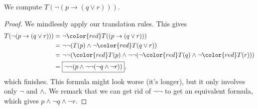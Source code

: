\begin{exe}
	We compute $T(\lnot(p\to(q\lor r)))$.
\end{exe}
\begin{proof}
	We mindlessly apply our translation rules. This gives
	\begin{align*}
		T(\lnot(p\to(q\lor r))) &= \lnot {\color{red}T((p\to(q\lor r)))} \\
		&= \lnot\lnot(T(p)\land\lnot {\color{red}T(q\lor r)}) \\
		&= \lnot\lnot({\color{red}T(p)}\land\lnot\lnot(\lnot {\color{red}T(q)}\land\lnot {\color{red}T(r)})) \\
		&= \boxed{\lnot\lnot(p\land\lnot\lnot(\lnot q\land\lnot r))},
	\end{align*}
	which finishes. This formula might look worse (it's longer), but it only involves only $\lnot$ and $\land$. We remark that we can get rid of $\lnot\lnot$ to get an equivalent formula, which gives $p\land\lnot q\land\lnot r$.
\end{proof}

